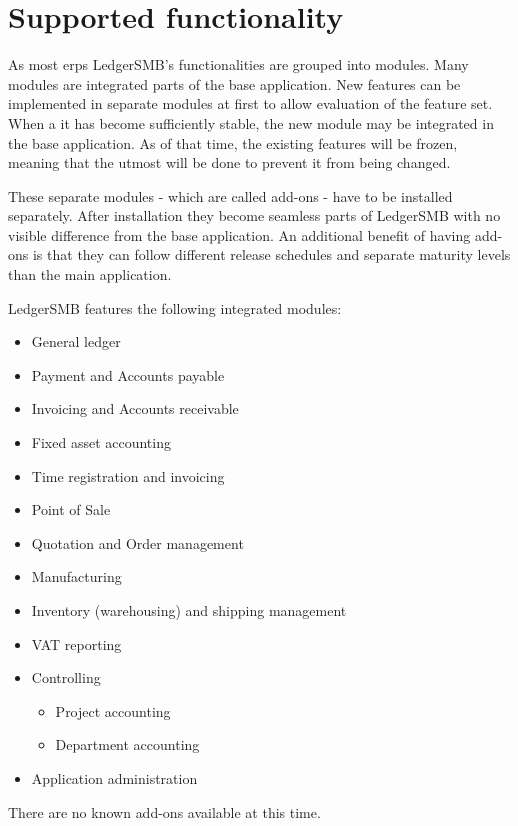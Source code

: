 \section{Supported functionality}
\label{sec-ledgersmb-modules}
As most \glspl{erp} LedgerSMB's functionalities are grouped into modules.
Many modules are integrated parts of the base application.  New features
can be implemented in separate modules at first to allow evaluation of the
feature set.  When a it has become sufficiently stable, the new module may
be integrated in the base application. As of that time, the existing features
will be frozen, meaning that the utmost will be done to prevent it from being
changed.

These separate modules - which are called \glspl{add-on} - have to be
installed separately.  After installation they become seamless parts of
LedgerSMB with no visible difference from the base application. An
additional benefit of having \glspl{add-on} is that they can follow different
release schedules and separate maturity levels than the main application.


LedgerSMB \ledgerSMBversion features the following integrated modules:

\begin{itemize}
	\item General ledger
	\item Payment and Accounts payable
	\item Invoicing and Accounts receivable
	\item Fixed asset accounting
	\item Time registration and invoicing
	\item Point of Sale
	\item Quotation and Order management
	\item Manufacturing
	\item Inventory (warehousing) and shipping management
	\item VAT reporting
	\item Controlling
	\begin{itemize}
		\item Project accounting
		\item Department accounting
	\end{itemize}
	\item Application administration
\end{itemize}

There are no known \glspl{add-on} available at this time.

